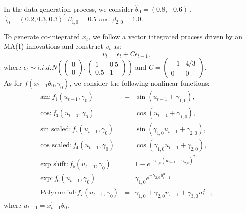 \documentclass[a4paper,12pt,times,numbered,print,index]{report}
\numberwithin{equation}{section}
\begin{document}
	In the data generation process, we consider $\hat{\theta}_0 = (0.8, -0.6)^{\prime}$, $\hat{\gamma}_0 = (0.2, 0.3, 0.3)^{\prime}$ $\beta_{1,0} = 0.5$ and $\beta_{2,0} = 1.0$.
	
	To generate co-integrated $x_t$, we follow a vector integrated process driven by an MA(1) innovations and construct $v_t$ as:
	$$v_t = \epsilon_t + C\epsilon_{t-1},$$
	where $\epsilon_{t} \sim i.i.d. N\left(\left(\begin{array}{c}
		0 \\
		0
	\end{array}\right)
	,\left(\begin{array}{cc}1 & 0.5 \\ 0.5 & 1\end{array}\right)\right)$ and $C=\left(\begin{array}{cc} -1  & 4/ 3 \\ 0 & 0\end{array}\right)$. 
	\\
	
	As for $f\left( x_{t-1}^{\prime }\theta _{0},\gamma _{0}\right)$, we consider the following nonlinear functions:
	\begin{eqnarray*}
		\text{sin}: f_{1}\left( u_{t-1},\gamma _{0}\right) &=&\sin \left( u_{t-1}+\gamma_{1,0}\right),  \\
		\text{cos}: f_{2}\left( u_{t-1},\gamma _{0}\right) &=&\cos \left( u_{t-1}+\gamma_{1,0}\right), \\
		\text{sin\_scaled}: f_{3}\left( u_{t-1},\gamma_{0}\right) &=&\sin \left( \gamma_{1,0}u_{t-1}+\gamma_{2,0}\right),  \\
		\text{cos\_scaled}: f_{4}\left( u_{t-1},\gamma_{0}\right) &=&\cos \left( \gamma_{1,0}u_{t-1}+\gamma_{2,0}\right), \\
		\text{exp\_shift}: f_{5}\left( u_{t-1}, \gamma_{0}\right) &=& 1-e^{-\gamma_{1,0}\left(u_{t-1}-\gamma_{2,0}\right)^{2}} \\
		\text{exp}: f_{6}\left( u_{t-1},\gamma _{0}\right) &=& \gamma_{1,0} e^{-\gamma_{2,0}u_{t-1}^2}  \\
		\text{Polynomial}: f_{7}\left( u_{t-1},\gamma_{0}\right) &=&\gamma_{1,0}+ \gamma_{2,0}u_{t-1}+\gamma_{3,0}u_{t-1}^{2}
	\end{eqnarray*}%
	where $u_{t-1} =  x_{t-1}^{\prime }\theta _{0}$.
	
\end{document}
